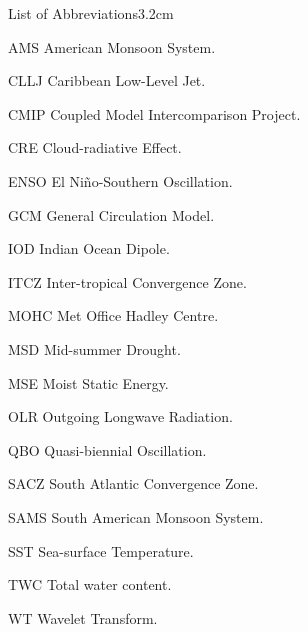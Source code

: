 \begin{mclistof}{List of Abbreviations}{3.2cm}

\item[AMS] American Monsoon System.

\item[CLLJ] Caribbean Low-Level Jet.

\item[CMIP] Coupled Model Intercomparison Project.

\item[CRE] Cloud-radiative Effect.

\item[ENSO] El Niño-Southern Oscillation.

\item[GCM] General Circulation Model. 

\item[IOD] Indian Ocean Dipole.

\item[ITCZ] Inter-tropical Convergence Zone.

\item[MOHC] Met Office Hadley Centre.

\item[MSD] Mid-summer Drought.

\item[MSE] Moist Static Energy.

\item[OLR] Outgoing Longwave Radiation.

\item[QBO] Quasi-biennial Oscillation.

\item[SACZ] South Atlantic Convergence Zone. 

\item[SAMS] South American Monsoon System. 

\item[SST] Sea-surface Temperature.

\item[TWC] Total water content.

\item[WT] Wavelet Transform.


\end{mclistof} 
